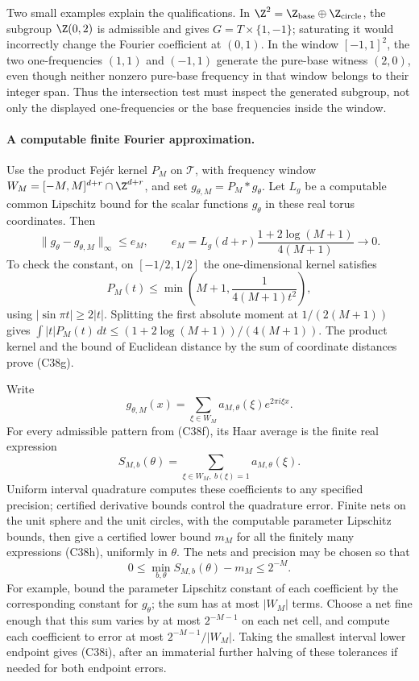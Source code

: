 Two small examples explain the qualifications.  In
$\Z^2=\Z_{\rm base}\oplus\Z_{\rm circle}$, the subgroup
$\Z(0,2)$ is admissible and gives
$G=T\times\{1,-1\}$; saturating it would incorrectly change
the Fourier coefficient at $(0,1)$.  In the window $[-1,1]^2$,
the two one-frequencies $(1,1)$ and $(-1,1)$ generate the
pure-base witness $(2,0)$, even though neither nonzero pure-base
frequency in that window belongs to their integer span.  Thus
the intersection test must inspect the generated subgroup, not
only the displayed one-frequencies or the base frequencies
inside the window.

\paragraph{A computable finite Fourier approximation.}
Use the product Fej\'er kernel $P_M$ on $\mathcal T$, with
frequency window
$W_M=[-M,M]^{d+r}\cap\Z^{d+r}$, and set
$g_{\theta,M}=P_M*g_\theta$.  Let $L_g$ be a computable common
Lipschitz bound for the scalar functions $g_\theta$ in these
real torus coordinates.  Then
\[
 \|g_\theta-g_{\theta,M}\|_\infty\le e_M,
 \qquad
 e_M=L_g(d+r)
          \frac{1+2\log(M+1)}{4(M+1)}\longrightarrow0.
 \tag{C38g}
\]
To check the constant, on $[-1/2,1/2]$ the one-dimensional
kernel satisfies
\[
 P_M(t)\le\min\left(M+1,\frac1{4(M+1)t^2}\right),
\]
using $|\sin\pi t|\ge2|t|$.  Splitting the first absolute
moment at $1/(2(M+1))$ gives
$\int|t|P_M(t)\,dt\le(1+2\log(M+1))/(4(M+1))$.
The product kernel and the bound of Euclidean distance by the sum
of coordinate distances prove (C38g).

Write
\[
       g_{\theta,M}(x)=
               \sum_{\xi\in W_M}a_{M,\theta}(\xi)e^{2\pi i\xi x}.
\]
For every admissible pattern from (C38f), its Haar average is the
finite real expression
\[
           S_{M,b}(\theta)=
                   \sum_{\xi\in W_M,\ b(\xi)=1}a_{M,\theta}(\xi).
 \tag{C38h}
\]
Uniform interval quadrature computes these coefficients to any
specified precision; certified derivative bounds control the
quadrature error.  Finite nets on the unit sphere and the unit
circles, with the computable parameter Lipschitz bounds, then
give a certified lower bound $m_M$ for all the finitely many
expressions (C38h), uniformly in $\theta$.  The nets and
precision may be chosen so that
\[
 0\le \min_{b,\theta}S_{M,b}(\theta)-m_M\le 2^{-M}.
 \tag{C38i}
\]
For example, bound the parameter Lipschitz constant of each
coefficient by the corresponding constant for $g_\theta$;
the sum has at most $|W_M|$ terms.  Choose a net fine enough
that this sum varies by at most $2^{-M-1}$ on each net cell,
and compute each coefficient to error at most
$2^{-M-1}/|W_M|$.  Taking the smallest interval lower endpoint
gives (C38i), after an immaterial further halving of these
tolerances if needed for both endpoint errors.

